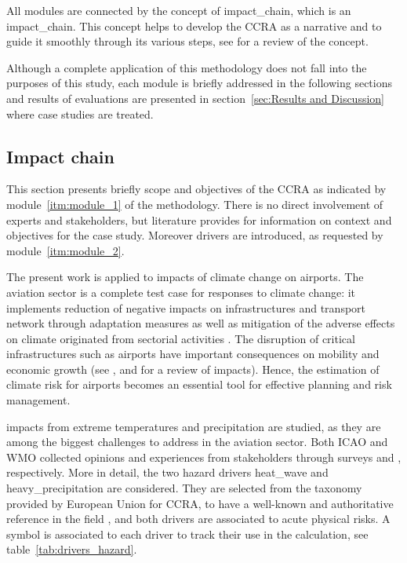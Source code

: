 All modules are connected by the concept of \gls{impact_chain}, which is an \glsdesc{impact_chain}. This concept helps to develop the \gls{CCRA} as a narrative and to guide it smoothly through its various steps, see \cite[217-224]{2022KondrupClimateAdaptation} for a review of the concept.

Although a complete application of this methodology does not fall into the purposes of this study, each module is briefly addressed in the following sections and results of evaluations are presented in section~\ref{sec:Results and Discussion} where case studies are treated.



\subsection{Impact chain}
\label{sec:Impact chain}
This section presents briefly scope and objectives of the \gls{CCRA} as indicated by module~\ref{itm:module_1} of the methodology. There is no direct involvement of experts and stakeholders, but literature provides for information on context and objectives for the case study. Moreover \glspl{driver} are introduced, as requested by module~\ref{itm:module_2}.

The present work is applied to impacts of climate change on airports.
The aviation sector is a complete test case for responses to climate change: it implements reduction of negative \glspl{impact} on infrastructures and transport network through adaptation measures as well as mitigation of the adverse effects on climate originated from sectorial activities \cite{2022ICAOICAOEnvironmental}. The disruption of critical infrastructures such as airports have important consequences on mobility and economic growth (see \cite{2018ICAOClimateAdaptation}, \cite[15]{2016BurbidgeAdaptingEuropean} and \cite[548]{2022DeVivoRiskAssessment} for a review of impacts). Hence, the estimation of climate \gls{risk} for airports becomes an essential tool for effective planning and risk management.

\Glspl{impact} from extreme temperatures and precipitation are studied, as they are among the biggest challenges to address in the aviation sector. Both \Gls{ICAO} and \gls{WMO} collected opinions and experiences from stakeholders through surveys \cite[62]{2018ICAOClimateAdaptation} and \cite[34]{2020WorldMeteorologicalOrganizationWMOOutcomesOf}, respectively.
More in detail, the two \gls{hazard} \glspl{driver} \gls{heat_wave} and \gls{heavy_precipitation} are considered. They are selected from the taxonomy provided by European Union for \gls{CCRA}, to have a well-known and authoritative reference in the field \cite[177]{2024EU20212139}, and both drivers are associated to acute physical risks. A symbol is associated to each \gls{driver} to track their use in the calculation, see table~\ref{tab:drivers_hazard}.

